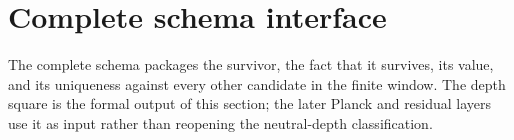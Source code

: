 \documentclass[11pt]{article}
\begin{document}
\begin{code}
\AgdaSpace{}%
\<%
\\
%
\>[2]\AgdaSpace{}%
\AgdaSpace{}%
\<%
\\
\>[0]\AgdaSpace{}%
\AgdaSpace{}%
\AgdaSymbol{(()}\AgdaSpace{}%
\AgdaOperator{\AgdaInductiveConstructor{,}}\AgdaSpace{}%
\AgdaSymbol{\AgdaUnderscore{})}\<%
\\
\>[0]\AgdaSpace{}%
\AgdaSpace{}%
\AgdaSymbol{(\AgdaUnderscore{}}\AgdaSpace{}%
\AgdaOperator{\AgdaInductiveConstructor{,}}\AgdaSpace{}%
\AgdaSymbol{(()}\AgdaSpace{}%
\AgdaOperator{\AgdaInductiveConstructor{,}}\AgdaSpace{}%
\AgdaSymbol{\AgdaUnderscore{}))}\<%
\\
\>[0]\AgdaSpace{}%
\AgdaSpace{}%
\AgdaSymbol{\AgdaUnderscore{}}\AgdaSpace{}%
\AgdaSymbol{=}\AgdaSpace{}%
\<%
\\
\>[0]\AgdaSpace{}%
\AgdaSpace{}%
\AgdaSymbol{(\AgdaUnderscore{}}\AgdaSpace{}%
\AgdaOperator{\AgdaInductiveConstructor{,}}\AgdaSpace{}%
\AgdaSymbol{(\AgdaUnderscore{}}\AgdaSpace{}%
\AgdaOperator{\AgdaInductiveConstructor{,}}\AgdaSpace{}%
\AgdaSymbol{()))}\<%
\end{code}

\section{Complete schema interface}

The complete schema packages the survivor, the fact that it survives,
its value, and its uniqueness against every other candidate in the
finite window.  The depth square is the formal output of this section;
the later Planck and residual layers use it as input rather than
reopening the neutral-depth classification.
\end{document}
